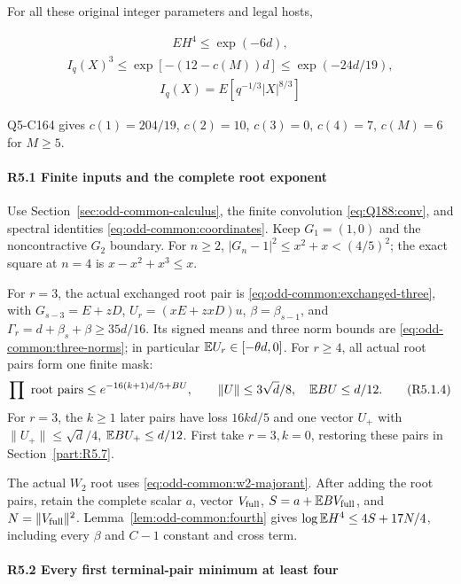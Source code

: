 For all these original integer parameters and legal hosts,

\[
\begin{gathered}
EH^4\le \exp(-6d), 
\end{gathered}\tag{R5.0.1}
\]
\[
\begin{gathered}
I_q(X)^3\le \exp[-(12-c(M))d]\le \exp(-24d/19), 
\end{gathered}\tag{R5.0.2}
\]
\[
\begin{gathered}
I_q(X)=E[q^{-1/3}|X|^{8/3}]
\end{gathered}
\]

Q5-C164 gives \(c(1)=204/19\), \(c(2)=10\), \(c(3)=0\), \(c(4)=7\), \(c(M)=6\) for \(M\ge5\). \paragraph{R5.1 Finite inputs and the complete root exponent}\label{part:R5.1}

Use Section~\ref{sec:odd-common-calculus}, the finite convolution
\eqref{eq:Q188:conv}, and spectral identities
\eqref{eq:odd-common:coordinates}.
Keep \(G_1=(1,0)\) and the noncontractive \(G_2\) boundary.
For \(n\ge2\), \(|G_n-1|^2\le x^2+x<(4/5)^2\);
the exact square at \(n=4\) is \(x-x^2+x^3\le x\).

For \(r=3\), the actual exchanged root pair is
\eqref{eq:odd-common:exchanged-three}, with
\(G_{s-3}=E+zD\), \(U_r=(xE+zxD)u\),
\(\beta=\beta_{s-1}\), and
\(\Gamma_r=d+\beta_s+\beta\ge35d/16\).
Its signed means and three norm bounds are
\eqref{eq:odd-common:three-norms}; in particular
\(\mathbb E U_r\in[-\theta d,0]\).
For \(r\ge4\), all actual root pairs form one finite mask:
\[
 \prod\text{ root pairs}\le e^{-16(k+1)d/5+BU},\qquad
 \|U\|\le3\sqrt d/8,\quad\mathbb E BU\le d/12.\tag{R5.1.4}
\]
For \(r=3\), the \(k\ge1\) later pairs have loss \(16kd/5\)
and one vector \(U_+\) with \(\|U_+\|\le\sqrt d/4\),
\(\mathbb E BU_+\le d/12\). First take \(r=3,k=0\), restoring these
pairs in Section~\ref{part:R5.7}.

The actual \(W_2\) root uses \eqref{eq:odd-common:w2-majorant}.
After adding the root pairs, retain the complete scalar \(a\), vector
\(V_{\rm full}\), \(S=a+\mathbb E BV_{\rm full}\), and
\(N=\|V_{\rm full}\|^2\).
Lemma~\ref{lem:odd-common:fourth} gives \(\log\mathbb E H^4\le4S+17N/4\),
including every \(\beta\) and \(C-1\) constant and cross term.

\paragraph{R5.2 Every first terminal-pair minimum at least four}

